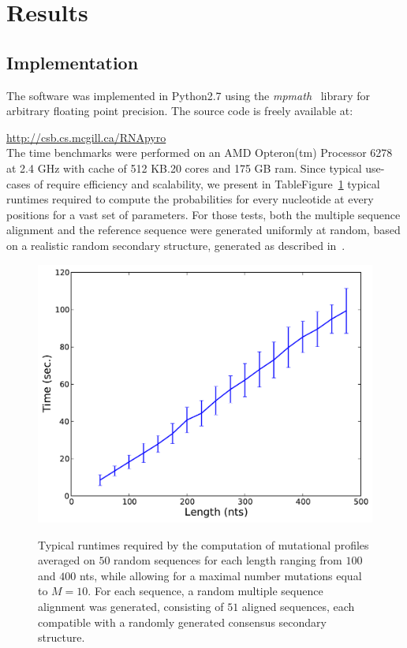 \section{Results}
\label{sec:results}

\subsection{Implementation}
The software was implemented in Python2.7 using the \textit{mpmath}~\citep{mpmath} library
for  arbitrary floating point precision. The source code is freely available at:


{\centering \url{http://csb.cs.mcgill.ca/RNApyro}\\}
The time benchmarks were performed on an AMD Opteron(tm) Processor 6278  at 2.4 GHz with cache of 512 KB.20 cores and 175 GB ram.
Since typical use-cases of \RNApyro require efficiency and scalability, we present in TableFigure~\ref{fig:time}
typical runtimes required to compute the probabilities for  every nucleotide at every positions for a vast set of parameters.
For those tests, both the multiple sequence alignment and the reference sequence were generated uniformly at random,
based on a realistic random secondary structure, generated as described in~\cite{Levin:2012kx}.

\begin{figure}[t]
{\centering \includegraphics[width=.5\linewidth]{Figure4-TimeBenchmark}\\}

\caption{Typical runtimes required by the computation of mutational profiles 
averaged on $50$ random sequences for each length ranging from $100$ and $400$ nts, while allowing for a maximal number mutations equal to $M=10$. 
For each sequence, a random multiple sequence alignment was generated, consisting of $51$ aligned sequences, each compatible with a randomly generated consensus secondary structure. 
}
\label{fig:time}
\end{figure}


